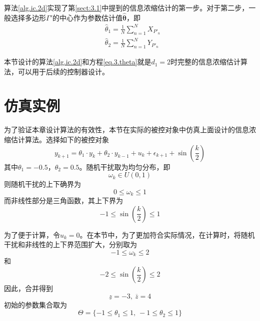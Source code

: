 算法\ref{alg.ic.2d}实现了第\ref{sect:3.1}中提到的信息浓缩估计的第一步。对于第二步，一般选择多边形$\Gamma'$的中心作为参数估计值$\hat{\bm{\theta}}$，即
\begin{equation}\label{eq.3.theta}
\begin{split}%
&\hat{\theta}_{1}=\frac1N\sum_{n=1}^{N}X_{P'_{n}}\\
&\hat{\theta}_{2}=\frac1N\sum_{n=1}^{N}Y_{P'_{n}}
\end{split}
\end{equation}

本节设计的算法\ref{alg.ic.2d}和方程\eqref{eq.3.theta}就是$d_{1}=2$时完整的信息浓缩估计算法，可以用于后续的控制器设计。

\section{仿真实例}\label{sect:3.4}
为了验证本章设计算法的有效性，本节在实际的被控对象中仿真上面设计的信息浓缩估计算法。选择如下的被控对象
\begin{equation}
\label{eq.3.sys.eq}
y_{k+1}=\theta_{1}\cdot y_{k} +\theta_{2}\cdot y_{k-1}+u_{k}+\epsilon_{k+1}+\sin(\frac{k}2)
\end{equation}
其中$\theta_{1}=-0.5$，$\theta_{2}=0.5$。随机干扰取为均匀分布，即
\begin{equation*}
\omega_{k}\in U(0,1) 
\end{equation*}
则随机干扰的上下确界为
\begin{equation*}
0\leq\omega_{k}\leq1
\end{equation*}
而非线性部分是三角函数，其上下界为
\begin{equation*}
-1\leq\sin(\frac{k}2)\leq1
\end{equation*}

为了便于计算，令$u_{k}=0$。在本节中，为了更加符合实际情况，在计算时，将随机干扰和非线性的上下界范围扩大，分别取为
\begin{equation*}
-1\leq\omega_{k}\leq2
\end{equation*}
和
\begin{equation*}
-2\leq\sin(\frac{k}2)\leq2
\end{equation*}
因此，合并得到
\begin{equation*}
\underline{z}=-3,\ \overline{z}=4
\end{equation*}
初始的参数集合取为
\begin{equation*}%
\Theta=\{-1\leq\theta_{1}\leq1,\ -1\leq\theta_{2}\leq1\}
\end{equation*}

